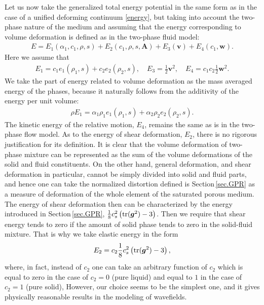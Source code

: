 \documentclass[3p,times,table]{article}
\renewcommand{\AA}{{\bm{A}}}
\renewcommand{\ggg}{{\bm{g}}}
\newcommand{\vv}{{\bm{v}}}
\newcommand{\ww}{{\bm{w}}}
\newcommand{\tr}{\textnormal{tr}}
\begin{document}
Let us now take the generalized total energy potential in the same form as in 
the case 
of a unified deforming continuum \eqref{energy}, but taking into account 
the two-phase nature of the medium and assuming that the energy corresponding to  
volume deformation is defined as in the two-phase fluid model: 
\begin{align}
E=E_1(\alpha_1, c_1, \rho, s)+E_2(c_1,\rho,s,\AA)+E_3(\vv)+E_4(c_1,\ww). 
\label{energy.SF}
\end{align}
Here we assume that 
\begin{align} \label{energy12.SF}
E_1=c_1e_1(\rho_1,s)+c_2e_2(\rho_2,s), \quad
E_3=\frac{1}{2}\vv^2, \quad E_4=c_1c_2\frac{1}{2}\ww^2.
\end{align}
We take the part of energy related to volume deformation as the mass 
averaged energy of the phases, because it naturally follows from the additivity 
of the energy per unit volume:
\begin{align} \label{energy.mix}
\rho E_1=\alpha_1 \rho_1e_1(\rho_1,s)+\alpha_2 \rho_2 e_2(\rho_2,s). 
\end{align}
The kinetic energy of the relative motion, $E_4$, remains the same as is in the 
two-phase flow model.
As to the energy of shear deformation, $E_2$, there is no rigorous 
justification for its definition. It is clear that the volume deformation of 
two-phase mixture can be represented as the sum of the volume deformations of the solid 
and fluid constituents. On the other hand, general deformation, and shear 
deformation in particular, cannot be 
simply divided into solid and fluid parts, and hence one can take the 
normalized 
distortion 
defined is Section\,\ref{sec.GPR} as a measure of deformation of the whole element 
of the saturated porous medium. The energy of shear deformation then can be 
characterized by the energy introduced in Section\,\ref{sec.GPR},
$
\frac18c_s^2\left(\tr({\ggg^2})-3\right)
$. 
Then we require that shear energy tends to zero 
if the amount of solid phase tends to zero in the solid-fluid mixture. That is why we take elastic  
energy in the form
\begin{align} \label{energy,shear}
E_2=c_2 \frac{1}{8}c_s^2\left(\tr({\ggg^2})-3\right),
\end{align}
where, in fact, instead of $c_2$ one can take an arbitrary 
function of $c_2$ which is equal to zero in the case of $c_2=0$ (pure liquid) 
and 
equal to $1$ in the case of $c_2=1$ (pure solid),
However, our choice seems to be the simplest one, and it gives physically 
reasonable results in the modeling of wavefields.
\end{document}
